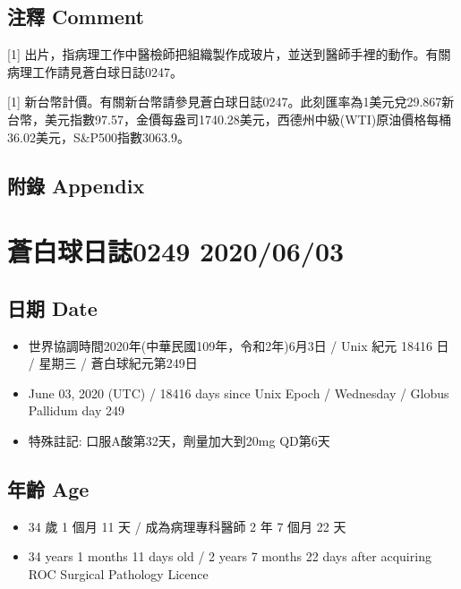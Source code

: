 \documentclass[a5paper, 11pt
]{book}
\providecommand{\tightlist}{%
  \setlength{\itemsep}{0pt}\setlength{\parskip}{0pt}}
\begin{document}
\hypertarget{ux6ce8ux91cb-comment-1}{%
\subsection{注釋 Comment}\label{ux6ce8ux91cb-comment-1}}

{[}1{]}
出片，指病理工作中醫檢師把組織製作成玻片，並送到醫師手裡的動作。有關病理工作請見蒼白球日誌0247。

{[}1{]}
新台幣計價。有關新台幣請參見蒼白球日誌0247。此刻匯率為1美元兌29.867新台幣，美元指數97.57，金價每盎司1740.28美元，西德州中級(WTI)原油價格每桶36.02美元，S\&P500指數3063.9。

\hypertarget{ux9644ux9304-appendix-1}{%
\subsection{附錄 Appendix}\label{ux9644ux9304-appendix-1}}

\hypertarget{ux84bcux767dux7403ux65e5ux8a8c0249-20200603}{%
\section{蒼白球日誌0249
2020/06/03}\label{ux84bcux767dux7403ux65e5ux8a8c0249-20200603}}

\hypertarget{ux65e5ux671f-date-2}{%
\subsection{日期 Date}\label{ux65e5ux671f-date-2}}

\begin{itemize}
\tightlist
\item
  世界協調時間2020年(中華民國109年，令和2年)6月3日 / Unix 紀元 18416 日
  / 星期三 / 蒼白球紀元第249日
\item
  June 03, 2020 (UTC) / 18416 days since Unix Epoch / Wednesday / Globus
  Pallidum day 249
\item
  特殊註記: 口服A酸第32天，劑量加大到20mg QD第6天
\end{itemize}

\hypertarget{ux5e74ux9f61-age-2}{%
\subsection{年齡 Age}\label{ux5e74ux9f61-age-2}}

\begin{itemize}
\tightlist
\item
  34 歲 1 個月 11 天 / 成為病理專科醫師 2 年 7 個月 22 天
\item
  34 years 1 months 11 days old / 2 years 7 months 22 days after
  acquiring ROC Surgical Pathology Licence
\end{itemize}
\end{document}
